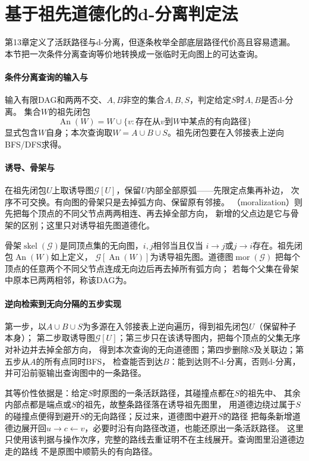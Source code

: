 \section{基于祖先道德化的d-分离判定法}
\label{sec:graph-theory-directed-transformations}

第13章定义了活跃路径与d-分离，但逐条枚举全部底层路径代价高且容易遗漏。
本节把一次条件分离查询等价地转换成一张临时无向图上的可达查询。

\paragraph{条件分离查询的输入与}
输入有限DAG和两两不交、$A,B$非空的集合$A,B,S$，判定给定$S$时$A,B$是否d-分离。
集合$W$的祖先闭包
\[
  \operatorname{An}(W)=W\cup\{v:\text{存在从}v\text{到}W\text{中某点的有向路径}\}
\]
显式包含$W$自身；本次查询取$W=A\cup B\cup S$。祖先闭包要在入邻接表上逆向BFS/DFS求得。

\paragraph{诱导、骨架与}
在祖先闭包$U$上取诱导图$\mathcal G[U]$，保留$U$内部全部原弧——先限定点集再补边，
次序不可交换。有向图的骨架只是去掉弧方向、保留原有邻接。
（moralization）则先把每个顶点的不同父节点两两相连、再去掉全部方向，
新增的父点边是它与骨架的区别；这里只对诱导祖先图道德化。

\begin{definition}[骨架、祖先闭包与道德图]
  \label{def:graph-theory-directed-structure}
  骨架$\operatorname{skel}(\mathcal G)$是同顶点集的无向图，$i,j$相邻当且仅当
  $i\to j$或$j\to i$存在。祖先闭包$\operatorname{An}(W)$如上定义，
  $\mathcal G[\operatorname{An}(W)]$为诱导祖先图。道德图$\operatorname{mor}(\mathcal G)$
  把每个顶点的任意两个不同父节点连成无向边后再去掉所有弧方向；
  若每个父集在骨架中原本已两两相邻，称该DAG为。
\end{definition}

\paragraph{逆向检索到无向分隔的五步实现}
\begin{algorithm}
  第一步，以$A\cup B\cup S$为多源在入邻接表上逆向遍历，得到祖先闭包$U$（保留种子本身）；
  第二步取诱导图$\mathcal G[U]$；第三步只在该诱导图内，把每个顶点的父集无序对补边并去掉全部方向，
  得到本次查询的无向道德图；第四步删除$S$及关联边；第五步从$A$的所有点同时BFS，
  检查能否到达$B$：能到达则不d-分离，否则d-分离，并可沿前驱输出查询图中的一条路径。
\end{algorithm}
其等价性依据是：给定$S$时原图的一条活跃路径，其碰撞点都在$S$的祖先中、
其余内部点都是端点或$S$的祖先，故整条路径落在诱导祖先图里，
用道德边绕过属于$S$的碰撞点便得到避开$S$的无向路径；反过来，道德图中避开$S$的路径
把每条新增道德边展开回$u\to c\leftarrow v$，必要时沿有向路径改道，也能还原出一条活跃路径。
这里只使用该判据与操作次序，完整的路线去重证明不在主线展开。查询图里沿道德边走的路线
不是原图中顺箭头的有向路径。


